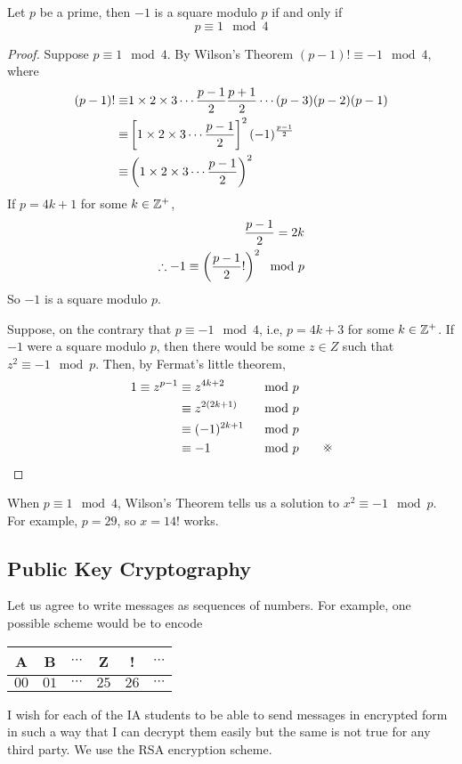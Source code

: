 \documentclass{article}
\begin{document}
\begin{nprop}
    Let $p$ be a prime, then $-1$ is a square modulo $p$ if and only if 
    \[
        p \equiv 1 \mod 4  
    \]
\end{nprop}
\begin{proof}
    Suppose $p \equiv 1 \mod 4$.
    By Wilson's Theorem $(p - 1)! \equiv -1 \mod 4$, where
    \begin{align*}
        (p-1)! \equiv& 1 \times 2 \times 3 \cdots \frac{p-1}{2} \frac{p + 1}{2} \cdots (p - 3)(p - 2)(p - 1) \\
        \equiv& \left[ 1 \times 2 \times 3 \cdots \frac{p-1}{2} \right]^2 (-1)^{\frac{p - 1}{2}} \\
        \equiv& \left( 1 \times 2 \times 3 \cdots \frac{p-1}{2} \right)^2
    \end{align*}
    If $p = 4k + 1$ for some $k \in \mathbb{Z}^+$,
    \begin{align*}
        \frac{p-1}{2} = 2k \\
        \therefore -1 \equiv \left( \frac{p - 1}{2}! \right)^2 \mod p
    \end{align*}
    So $-1$ is a square modulo $p$.

    Suppose, on the contrary that $p \equiv -1 \mod 4$, i.e, $p = 4k + 3$ for some $k \in \mathbb{Z}^+$. 
    If $-1$ were a square modulo $p$, then there would be some $z \in Z$ such that $z^2 \equiv -1 \mod p$.
    Then, by Fermat's little theorem,
    \begin{alignat*}{3}
        1 \equiv z^{p -1} &\equiv z^{4k + 2} &&\mod p \\
        &\equiv z^{2(2k + 1)} &&\mod p \\
        &\equiv (-1)^{2k + 1} &&\mod p \\
        &\equiv -1 &&\mod p \qquad  \contradiction
    \end{alignat*}
\end{proof}
\begin{remark}
When $p \equiv 1 \mod 4$, Wilson's Theorem tells us a solution to $x^2 \equiv -1 \mod p$.
For example, $p = 29$, so $x = 14!$ works. 
\end{remark}

\subsection{Public Key Cryptography}
Let us agree to write messages as sequences of numbers. For example, one possible scheme would be to encode
\begin{center}
    \begin{tabular}{c|c|c|c|c|c}
        A & B & $\cdots$ & Z & ! & $\cdots$ \\
        \hline
        $00$ & $01$ & $\cdots$ & $25$ & $26$ & $\cdots$
    \end{tabular}
\end{center}
I wish for each of the IA students to be able to send messages in encrypted form in such a way that I can decrypt them easily but the same is not true for any third party.
We use the RSA encryption scheme.
\end{document}
